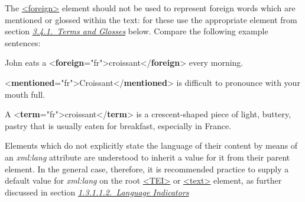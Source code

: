 The \hyperref[TEI.foreign]{<foreign>} element should not be used to represent foreign words which are mentioned or glossed within the text: for these use the appropriate element from section \textit{\hyperref[COHTG]{3.4.1.\ Terms and Glosses}} below. Compare the following example sentences: \par\bgroup{}\exampleFont \begin{shaded}\noindent\mbox{}John eats a {<\textbf{foreign}\hspace*{1em}{xml:lang}="{fr}">}croissant{</\textbf{foreign}>} every morning.\end{shaded}\egroup\par \noindent  \par\bgroup{}\exampleFont \begin{shaded}\noindent\mbox{}{<\textbf{mentioned}\hspace*{1em}{xml:lang}="{fr}">}Croissant{</\textbf{mentioned}>} is difficult to\mbox{}\newline 
 pronounce with your mouth full.\end{shaded}\egroup\par \noindent  \par\bgroup{}\exampleFont \begin{shaded}\noindent\mbox{}A {<\textbf{term}\hspace*{1em}{xml:lang}="{fr}">}croissant{</\textbf{term}>} is a crescent-shaped\mbox{}\newline 
 piece of light, buttery, pastry that is usually eaten for\mbox{}\newline 
 breakfast, especially in France.\end{shaded}\egroup\par \par
Elements which do not explicitly state the language of their content by means of an {\itshape xml:lang} attribute are understood to inherit a value for it from their parent element. In the general case, therefore, it is recommended practice to supply a default value for {\itshape xml:lang} on the root \hyperref[TEI.TEI]{<TEI>} or \hyperref[TEI.text]{<text>} element, as further discussed in section \textit{\hyperref[STGAla]{1.3.1.1.2.\ Language Indicators}}
